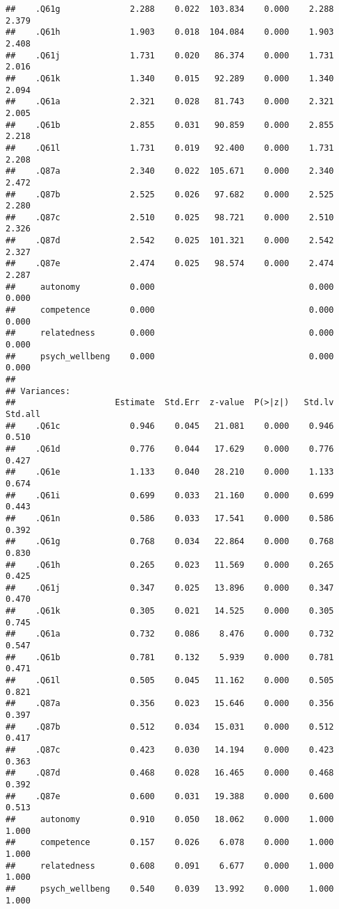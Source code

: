 \documentclass[
]{article}
\begin{document}
\begin{verbatim}
##    .Q61g              2.288    0.022  103.834    0.000    2.288    2.379
##    .Q61h              1.903    0.018  104.084    0.000    1.903    2.408
##    .Q61j              1.731    0.020   86.374    0.000    1.731    2.016
##    .Q61k              1.340    0.015   92.289    0.000    1.340    2.094
##    .Q61a              2.321    0.028   81.743    0.000    2.321    2.005
##    .Q61b              2.855    0.031   90.859    0.000    2.855    2.218
##    .Q61l              1.731    0.019   92.400    0.000    1.731    2.208
##    .Q87a              2.340    0.022  105.671    0.000    2.340    2.472
##    .Q87b              2.525    0.026   97.682    0.000    2.525    2.280
##    .Q87c              2.510    0.025   98.721    0.000    2.510    2.326
##    .Q87d              2.542    0.025  101.321    0.000    2.542    2.327
##    .Q87e              2.474    0.025   98.574    0.000    2.474    2.287
##     autonomy          0.000                               0.000    0.000
##     competence        0.000                               0.000    0.000
##     relatedness       0.000                               0.000    0.000
##     psych_wellbeng    0.000                               0.000    0.000
## 
## Variances:
##                    Estimate  Std.Err  z-value  P(>|z|)   Std.lv  Std.all
##    .Q61c              0.946    0.045   21.081    0.000    0.946    0.510
##    .Q61d              0.776    0.044   17.629    0.000    0.776    0.427
##    .Q61e              1.133    0.040   28.210    0.000    1.133    0.674
##    .Q61i              0.699    0.033   21.160    0.000    0.699    0.443
##    .Q61n              0.586    0.033   17.541    0.000    0.586    0.392
##    .Q61g              0.768    0.034   22.864    0.000    0.768    0.830
##    .Q61h              0.265    0.023   11.569    0.000    0.265    0.425
##    .Q61j              0.347    0.025   13.896    0.000    0.347    0.470
##    .Q61k              0.305    0.021   14.525    0.000    0.305    0.745
##    .Q61a              0.732    0.086    8.476    0.000    0.732    0.547
##    .Q61b              0.781    0.132    5.939    0.000    0.781    0.471
##    .Q61l              0.505    0.045   11.162    0.000    0.505    0.821
##    .Q87a              0.356    0.023   15.646    0.000    0.356    0.397
##    .Q87b              0.512    0.034   15.031    0.000    0.512    0.417
##    .Q87c              0.423    0.030   14.194    0.000    0.423    0.363
##    .Q87d              0.468    0.028   16.465    0.000    0.468    0.392
##    .Q87e              0.600    0.031   19.388    0.000    0.600    0.513
##     autonomy          0.910    0.050   18.062    0.000    1.000    1.000
##     competence        0.157    0.026    6.078    0.000    1.000    1.000
##     relatedness       0.608    0.091    6.677    0.000    1.000    1.000
##     psych_wellbeng    0.540    0.039   13.992    0.000    1.000    1.000
\end{verbatim}
\end{document}
